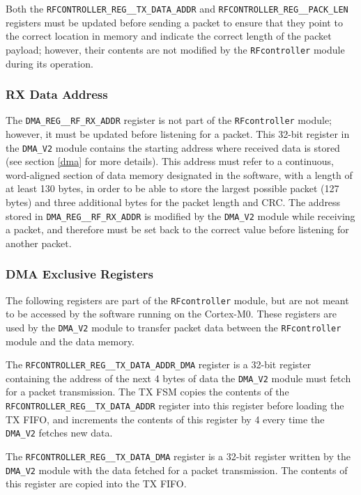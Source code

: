 Both the \texttt{RFCONTROLLER\_REG\_\_TX\_DATA\_ADDR} and \texttt{RFCONTROLLER\_REG\_\_PACK\-\_LEN} registers must be updated before sending a packet to ensure that they point to the correct location in memory and indicate the correct length of the packet payload; however, their contents are not modified by the \texttt{RFcontroller} module during its operation.

\subsubsection{RX Data Address}
The \texttt{DMA\_REG\_\_RF\_RX\_ADDR} register is not part of the \texttt{RFcontroller} module; however, it must be updated before listening for a packet. This 32-bit register in the \texttt{DMA\_V2} module contains the starting address where received data is stored (see section \ref{dma} for more details). This address must refer to a continuous, word-aligned section of data memory designated in the software, with a length of at least 130 bytes, in order to be able to store the largest possible packet (127 bytes) and three additional bytes for the packet length and CRC. The address stored in \texttt{DMA\_REG\_\_RF\_RX\_ADDR} is modified by the \texttt{DMA\_V2} module while receiving a packet, and therefore must be set back to the correct value before listening for another packet. 

\subsubsection{DMA Exclusive Registers}
The following registers are part of the \texttt{RFcontroller} module, but are not meant to be accessed by the software running on the Cortex-M0. These registers are used by the \texttt{DMA\_V2} module to transfer packet data between the \texttt{RFcontroller} module and the data memory.

The \texttt{RFCONTROLLER\_REG\_\_TX\_DATA\_ADDR\_DMA} register is a 32-bit register containing the address of the next 4 bytes of data the \texttt{DMA\_V2} module must fetch for a packet transmission. The TX FSM copies the contents of the \texttt{RFCONTROLLER\_REG\-\_\_TX\_DATA\_ADDR} register into this register before loading the TX FIFO, and increments the contents of this register by 4 every time the \texttt{DMA\_V2} fetches new data.

The \texttt{RFCONTROLLER\_REG\_\_TX\_DATA\_DMA} register is a 32-bit register written by the \texttt{DMA\_V2} module with the data fetched for a packet transmission. The contents of this register are copied into the TX FIFO.

